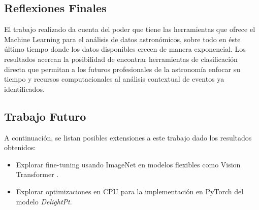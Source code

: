 \documentclass[../tesis.tex]{subfiles}
\begin{document}
\subsection{Reflexiones Finales}
El trabajo realizado da cuenta del poder que tiene las herramientas que ofrece el Machine Learning para el análisis de datos astronómicos, sobre todo en éste último tiempo donde los datos disponibles crecen de manera exponencial. Los resultados acercan la posibilidad de encontrar herramientas de clasificación directa que permitan a los futuros profesionales de la astronomía enfocar su tiempo y recursos computacionales al análisis contextual de eventos ya identificados.\par\null\par

\subsection{Trabajo Futuro}
A continuación, se listan posibles extensiones a este trabajo dado los resultados obtenidos:

\begin{itemize}
    \item Explorar fine-tuning usando ImageNet en modelos flexibles como Vision Transformer \cite{ViT}.
    \item Explorar optimizaciones en CPU para la implementación en PyTorch del modelo \textit{DelightPt}.    
\end{itemize}
\end{document}
